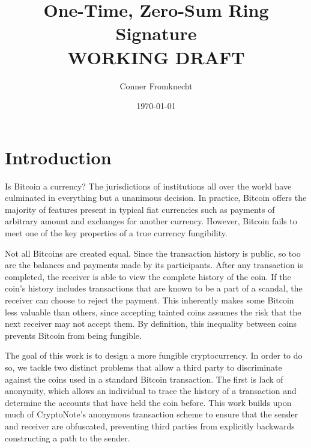 \documentclass{article}
\begin{document}
\title{One-Time, Zero-Sum Ring Signature \\ {\small WORKING DRAFT}}
\author{Conner Fromknecht}
\date{\today}

\maketitle

\section{Introduction}
  
Is Bitcoin a currency?  The jurisdictions of institutions all over the world
have culminated in everything but a unanimous decision.  In practice, Bitcoin
offers the majority of features present in typical fiat currencies such as
payments of arbitrary amount and exchanges for another currency.  However,
Bitcoin fails to meet one of the key properties of a true currency\textemdash
fungibility.

Not all Bitcoins are created equal.  Since the transaction history is public, so
too are the balances and payments made by its participants.  After any
transaction is completed, the receiver is able to view the complete history of
the coin. If the coin's history includes transactions that are known to be a
part of a scandal, the receiver can choose to reject the payment.  This
inherently makes some Bitcoin less valuable than others, since accepting tainted
coins assumes the risk that the next receiver may not accept them.  By
definition, this inequality between coins prevents Bitcoin from being fungible.

The goal of this work is to design a more fungible cryptocurrency.  In order to
do so, we tackle two distinct problems that allow a third party to discriminate
against the coins used in a standard Bitcoin transaction.  The first is lack of
anonymity, which allows an individual to trace the history of a transaction and
determine the accounts that have held the coin before.  This work builds upon
much of CryptoNote's \cite{S13} anonymous transaction scheme to ensure that the
sender and receiver are obfuscated, preventing third parties from explicitly
backwards constructing a path to the sender.  
\end{document}
